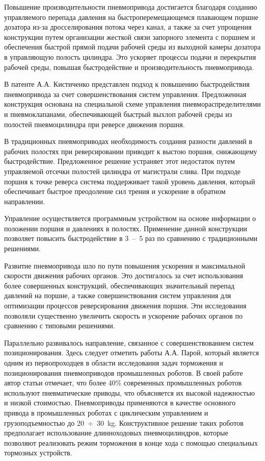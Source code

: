 Повышение производительности пневмопривода достигается благодаря созданию управляемого
перепада давления на быстроперемещающемся плавающем поршне дозатора из-за дросселирования
потока через канал, а также за счет упрощения конструкции путем организации жесткой связи запорного элемента
с поршнем и обеспечения быстрой прямой подачи рабочей среды из выходной камеры дозатора в
управляющую полость цилиндра. Это ускоряет процессы подачи и перекрытия рабочей среды, повышая
быстродействие и производительность пневмопривода.

В патенте А.А. Кистиченко \cite*{патент:Кистиченко} представлен подход к повышению
быстродействия пневмопривода за счет совершенствования
систем управления. Предложенная конструкция основана на специальной схеме управления пневмораспределителями
и пневмоклапанами, обеспечивающей быстрый выхлоп рабочей среды из полостей пневмоцилиндра при реверсе движения поршня.

В традиционных пневмоприводах необходимость создания разности давлений в рабочих полостях при реверсировании
приводит к выстою поршня, снижающему быстродействие. Предложенное решение устраняет этот недостаток путем управляемой
отсечки полостей цилиндра от магистрали слива. При подходе поршня к точке реверса система поддерживает такой уровень
давления, который обеспечивает быстрое преодоление сил трения и ускорение в обратном направлении.

Управление осуществляется программным устройством на основе информации о положении поршня и давлениях в полостях. Применение
данной конструкции позволяет повысить быстродействие в 3~--~5 раз по сравнению с традиционными решениями.

Развитие пневмопривода шло по пути повышения ускорения и максимальной скорости движения рабочих органов.
Это достигалось за счет использования более совершенных конструкций, обеспечивающих значительный перепад
давлений на поршне, а также совершенствования систем управления для оптимизации процессов реверсирования
движения поршня. Эти исследования позволяли существенно увеличить скорость и ускорение рабочих органов по
сравнению с типовыми решениями.

Параллельно развивалось направление, связанное с совершенствованием систем позиционирования. Здесь следует отметить работы А.А. Парой,
который является одним из первопроходцев в области исследования задач торможения и позиционирования пневмоприводов промышленных роботов.
В своей работе \cite*{парой:способы_торможения} автор статьи отмечает,
что более 40\%
современных промышленных роботов используют пневматические приводы, что объясняется их высокой надежностью и
низкой стоимостью. Пневмоприводы применяются в качестве основного привода в промышленных роботах с
циклическим управлением и грузоподъемностью до 20~$\div$~30~\si{\kilogram}. Конструктивное решение таких роботов
предполагает использование длинноходовых пневмоцилиндров, которые позволяют реализовать режим
торможения в конце хода с помощью специальных тормозных устройств.

